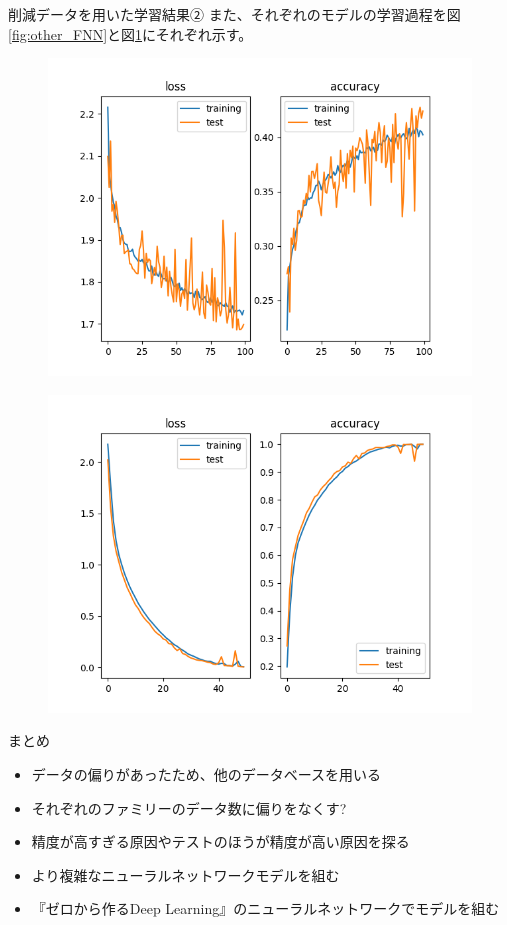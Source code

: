 \documentclass[dvipdfmx]{beamer}
\begin{document}
  \begin{frame}{削減データを用いた学習結果②}
    また、それぞれのモデルの学習過程を図\ref{fig:other_FNN}と図\ref{fig:other_CNN}にそれぞれ示す。
    \begin{figure}
      \begin{minipage}[b]{0.45\linewidth}
        \centering
        \includegraphics[keepaspectratio, scale=0.3]{images/other_train_fnn.png}
        \label{fig:other_FNN}
      \end{minipage}
      \begin{minipage}[b]{0.45\linewidth}
        \centering
        \includegraphics[keepaspectratio, scale=0.3]{images/other_train_cnn.png}
        \label{fig:other_CNN}
      \end{minipage}
    \end{figure}    
  \end{frame}

  \begin{frame}{まとめ}
    \begin{itemize}
      \item データの偏りがあったため、他のデータベースを用いる
      \item それぞれのファミリーのデータ数に偏りをなくす?
      \item 精度が高すぎる原因やテストのほうが精度が高い原因を探る
      \item より複雑なニューラルネットワークモデルを組む
      \item 『ゼロから作るDeep Learning』のニューラルネットワークでモデルを組む
    \end{itemize}
  \end{frame}
\end{document}
